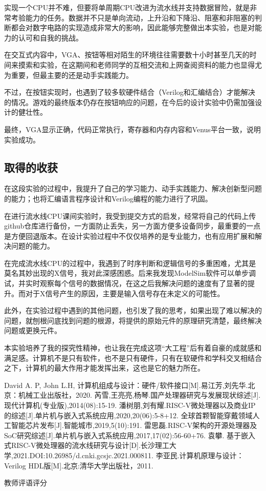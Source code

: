 \documentclass[UTF8,a4paper,autofakebold,15pt]{ctexart}
\begin{document}
	实现一个CPU并不难，但要将单周期CPU改进为流水线并支持数据冒险，就是非常考验能力的任务。数据并不只是单向流动，上升沿和下降沿、阻塞和非阻塞的判断都会对数字电路的实现造成非常大的影响，因此能够完整做出本实验，也是对能力的认可和自我的挑战。
	
	在交互式内容中，VGA、按钮等相对陌生的环境往往需要数十小时甚至几天的时间来摸索和实验，在这期间和老师同学的互相交流和上网查阅资料的能力也显得尤为重要，但最主要的还是动手实践能力。
	
	不过，在按钮实现时，也遇到了较多软硬件结合（Verilog和汇编结合）才能解决的情况。游戏的最终版本仍存在按钮响应的问题，在今后的设计实验中仍需加强设计的健壮性。
	
	最终，VGA显示正确，代码正常执行，寄存器和内存内容和Venus平台一致，说明实验成功。
\subsection{取得的收获}
	在这段实验的过程中，我提升了自己的学习能力、动手实践能力、解决创新型问题的能力；也将汇编语言程序设计和Verilog编程的能力进行了巩固。
	
	在进行流水线CPU课间实验时，我受到提交方式的启发，经常将自己的代码上传github仓库进行备份，一方面防止丢失，另一方面方便多设备同步，最重要的一点是方便回退版本。在设计实验过程中不仅仅培养的是专业能力，也有应用扩展和解决问题的能力。
	
	在完成流水线CPU的过程中，我遇到了时序判断和逻辑信号的多重困难，尤其是莫名其妙出现的X信号，我对此深感困惑。后来我发现ModelSim软件可以单步调试，并实时观察每个信号的数据情况，在这之后我解决问题的速度有了显著的提升。而对于X信号产生的原因，主要是输入信号存在未定义的可能性。
	
	此外，在实验过程中遇到的其他问题，也引发了我的思考，如果出现了难以解决的问题，就刨根问底找到问题的根源，将提供的原始元件的原理研究清楚，最终解决问题或更换元件。
	
	本实验培养了我的探究性精神，也让我在完成这项“大工程”后有着自豪的成就感和满足感。计算机不是只有软件，也不是只有硬件，只有在软硬件和学科交叉相结合之下，计算机的最大作用才能发挥出来，这也是它的魅力所在。
\newpage
\begin{thebibliography}{99}  
	
	David A. P, John L.H, 计算机组成与设计：硬件/软件接口[M].易江芳,刘先华.北京：机械工业出版社，2020.
	芮雪,王亮亮,杨琴.国产处理器研究与发展现状综述[J].现代计算机(专业版),2014(08):15-19.
	潘树朋,刘有耀.RISC-V微处理器以及商业IP的综述[J].单片机与嵌入式系统应用,2020,20(06):5-8+12.
	全球首颗智能穿戴领域人工智能芯片发布[J].智能城市,2019,5(10):191.
	雷思磊.RISC-V架构的开源处理器及SoC研究综述[J].单片机与嵌入式系统应用,2017,17(02):56-60+76.
	袁攀. 基于嵌入式RISC-V微处理器的流水线研究与设计[D].长沙理工大学,2021.DOI:10.26985/d.cnki.gcsjc.2021.000811.
	李亚民.计算机原理与设计：Verilog HDL版[M].北京:清华大学出版社，2011.
	
\end{thebibliography}
\newpage
\begin{center}
	 教师评语评分
\end{center}
\end{document}
